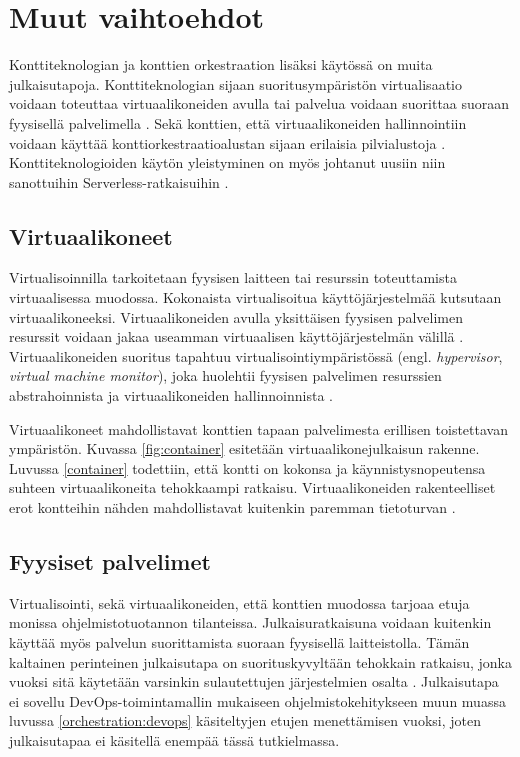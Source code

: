 \chapter{Muut vaihtoehdot\label{options}}

Konttiteknologian ja konttien orkestraation lisäksi käytössä on muita julkaisutapoja. Konttiteknologian sijaan suoritusympäristön virtualisaatio voidaan toteuttaa virtuaalikoneiden avulla tai palvelua voidaan suorittaa suoraan fyysisellä palvelimella \cite{Watada19}.
Sekä konttien, että virtuaalikoneiden hallinnointiin voidaan käyttää konttiorkestraatioalustan sijaan erilaisia pilvialustoja \cite{Bousselmi14}.
Konttiteknologioiden käytön yleistyminen on myös johtanut uusiin niin sanottuihin Serverless-ratkaisuihin \cite{Baldini17}.

\section{Virtuaalikoneet}

Virtualisoinnilla tarkoitetaan fyysisen laitteen tai resurssin toteuttamista virtuaalisessa muodossa.
Kokonaista virtualisoitua käyttöjärjestelmää kutsutaan virtuaalikoneeksi.
Virtuaalikoneiden avulla yksittäisen fyysisen palvelimen resurssit voidaan jakaa useamman virtuaalisen käyttöjärjestelmän välillä \cite{Smith05}.
Virtuaalikoneiden suoritus tapahtuu virtualisointiympäristössä (engl. \textit{hypervisor}, \textit{virtual machine monitor}), joka huolehtii fyysisen palvelimen resurssien abstrahoinnista ja virtuaalikoneiden hallinnoinnista \cite{desai13}.

Virtuaalikoneet mahdollistavat konttien tapaan palvelimesta erillisen toistettavan ympäristön.
Kuvassa \ref{fig:container} esitetään virtuaalikonejulkaisun rakenne.
Luvussa \ref{container} todettiin, että kontti on kokonsa ja käynnistysnopeutensa suhteen virtuaalikoneita tehokkaampi ratkaisu.
Virtuaalikoneiden rakenteelliset erot kontteihin nähden mahdollistavat kuitenkin paremman tietoturvan \cite{Sultan19}.


\section{Fyysiset palvelimet}

Virtualisointi, sekä virtuaalikoneiden, että konttien muodossa tarjoaa etuja monissa ohjelmistotuotannon tilanteissa.
Julkaisuratkaisuna voidaan kuitenkin käyttää myös palvelun suorittamista suoraan fyysisellä laitteistolla.
Tämän kaltainen perinteinen julkaisutapa on suorituskyvyltään tehokkain ratkaisu, jonka vuoksi sitä käytetään varsinkin sulautettujen järjestelmien osalta \cite{Heiser08}.
Julkaisutapa ei sovellu DevOps-toimintamallin mukaiseen ohjelmistokehitykseen muun muassa luvussa \ref{orchestration:devops} käsiteltyjen etujen menettämisen vuoksi, joten julkaisutapaa ei käsitellä enempää tässä tutkielmassa.

